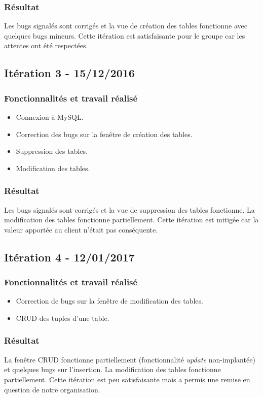 \subsubsection{Résultat}
Les bugs signalés sont corrigés et la vue de création des tables fonctionne avec quelques bugs mineurs.
Cette itération est satisfaisante pour le groupe car les attentes ont été respectées.

\subsection{Itération 3 - 15/12/2016}
\subsubsection{Fonctionnalités et travail réalisé}
\begin{itemize}
\item Connexion à MySQL.
\item Correction des bugs sur la fenêtre de création des tables.
\item Suppression des tables.
\item Modification des tables.
\end{itemize}

\subsubsection{Résultat}
Les bugs signalés sont corrigés et la vue de suppression des tables fonctionne.
La modification des tables fonctionne partiellement.
Cette itération est mitigée car la valeur apportée au client n'était pas conséquente. 


\subsection{Itération 4 - 12/01/2017}
\subsubsection{Fonctionnalités et travail réalisé}
\begin{itemize}
\item Correction de bugs sur la fenêtre de modification des tables.
\item CRUD des tuples d'une table.
\end{itemize}

\subsubsection{Résultat}
La fenêtre CRUD fonctionne partiellement (fonctionnalité \textit{update} non-implantée) et quelques bugs sur l'insertion. 
La modification des tables fonctionne partiellement.
Cette itération est peu satisfaisante mais a permis une remise en question de notre organisation. 

